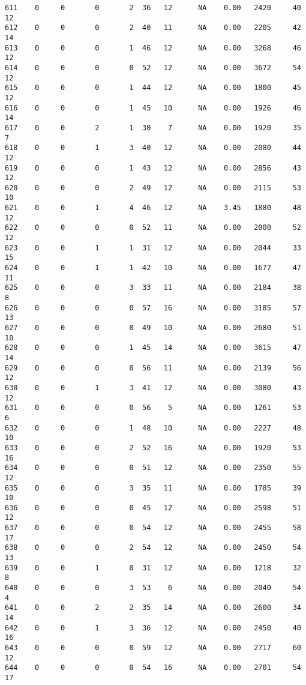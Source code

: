 \documentclass[
  letterpaper,
  DIV=11,
  numbers=noendperiod]{scrreprt}
\begin{document}
\begin{verbatim}
611    0     0       0       2  36   12      NA    0.00   2420     40      12
612    0     0       0       2  40   11      NA    0.00   2205     42      14
613    0     0       0       1  46   12      NA    0.00   3268     46      12
614    0     0       0       0  52   12      NA    0.00   3672     54      12
615    0     0       0       1  44   12      NA    0.00   1800     45      12
616    0     0       0       1  45   10      NA    0.00   1926     46      14
617    0     0       2       1  30    7      NA    0.00   1920     35       7
618    0     0       1       3  40   12      NA    0.00   2080     44      12
619    0     0       0       1  43   12      NA    0.00   2856     43      12
620    0     0       0       2  49   12      NA    0.00   2115     53      10
621    0     0       1       4  46   12      NA    3.45   1880     48      12
622    0     0       0       0  52   11      NA    0.00   2000     52      12
623    0     0       1       1  31   12      NA    0.00   2044     33      15
624    0     0       1       1  42   10      NA    0.00   1677     47      11
625    0     0       0       3  33   11      NA    0.00   2184     38       8
626    0     0       0       0  57   16      NA    0.00   3185     57      13
627    0     0       0       0  49   10      NA    0.00   2680     51      10
628    0     0       0       1  45   14      NA    0.00   3615     47      14
629    0     0       0       0  56   11      NA    0.00   2139     56      12
630    0     0       1       3  41   12      NA    0.00   3080     43      12
631    0     0       0       0  56    5      NA    0.00   1261     53       6
632    0     0       0       1  48   10      NA    0.00   2227     48      10
633    0     0       0       2  52   16      NA    0.00   1920     53      16
634    0     0       0       0  51   12      NA    0.00   2350     55      12
635    0     0       0       3  35   11      NA    0.00   1785     39      10
636    0     0       0       0  45   12      NA    0.00   2598     51      12
637    0     0       0       0  54   12      NA    0.00   2455     58      17
638    0     0       0       2  54   12      NA    0.00   2450     54      13
639    0     0       1       0  31   12      NA    0.00   1218     32       8
640    0     0       0       3  53    6      NA    0.00   2040     54       4
641    0     0       2       2  35   14      NA    0.00   2600     34      14
642    0     0       1       3  36   12      NA    0.00   2450     40      16
643    0     0       0       0  59   12      NA    0.00   2717     60      12
644    0     0       0       0  54   16      NA    0.00   2701     54      17

\end{verbatim}
\end{document}
